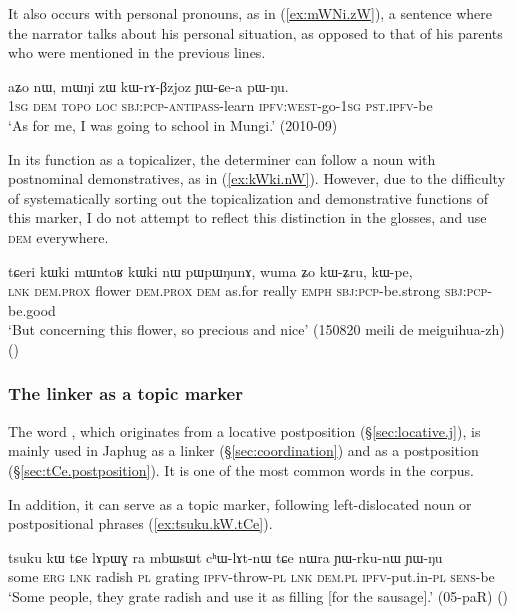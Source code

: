 It also occurs with personal pronouns, as in (\ref{ex:mWNi.zW}), a sentence where the narrator talks about his personal situation, as opposed to that of his parents who were mentioned in the previous lines.

\begin{exe}
\ex \label{ex:mWNi.zW}
\gll aʑo nɯ, mɯŋi zɯ kɯ-rɤ-βzjoz ɲɯ-ɕe-a pɯ-ŋu. \\
\textsc{1sg} \textsc{dem}  \textsc{topo} \textsc{loc} \textsc{sbj}:\textsc{pcp}-\textsc{antipass}-learn \textsc{ipfv}:\textsc{west}-go-\textsc{1sg} \textsc{pst}.\textsc{ipfv}-be \\
\glt `As for me, I was going to school in Mungi.' (2010-09)
\end{exe}

In its function as a topicalizer, the determiner  can follow a noun with postnominal demonstratives, as in (\ref{ex:kWki.nW}). However, due to the difficulty of systematically sorting out the topicalization and demonstrative functions of this marker, I do not attempt to reflect this distinction in the glosses, and use  \textsc{dem} everywhere.

\begin{exe}
\ex \label{ex:kWki.nW}
\gll tɕeri kɯki mɯntoʁ kɯki nɯ pɯpɯŋunɤ, wuma ʑo kɯ-ʑru, kɯ-pe, \\
\textsc{lnk} \textsc{dem}.\textsc{prox} flower \textsc{dem}.\textsc{prox} \textsc{dem} as.for really \textsc{emph} \textsc{sbj}:\textsc{pcp}-be.strong \textsc{sbj}:\textsc{pcp}-be.good \\ 
\glt `But concerning this flower, so precious and nice' (150820 meili de meiguihua-zh) ()
\end{exe}

\subsubsection{The linker  as a topic marker} \label{sec:tCe.topic}
The word , which originates from a locative postposition (§\ref{sec:locative.j}), is mainly used in Japhug as a linker (§\ref{sec:coordination}) and as a postposition (§\ref{sec:tCe.postposition}). It is one of the most common words in the corpus.

In addition, it can serve as a topic marker, following left-dislocated noun or postpositional phrases (\ref{ex:tsuku.kW.tCe}).

\begin{exe}
\ex \label{ex:tsuku.kW.tCe}
\gll tsuku kɯ tɕe lɤpɯɣ ra mbɯsɯt cʰɯ-lɤt-nɯ tɕe nɯra ɲɯ-rku-nɯ ɲɯ-ŋu \\
some \textsc{erg} \textsc{lnk} radish \textsc{pl} grating \textsc{ipfv}-throw-\textsc{pl} \textsc{lnk} \textsc{dem}.\textsc{pl} \textsc{ipfv}-put.in-\textsc{pl} \textsc{sens}-be \\
\glt `Some people, they grate radish and use it as filling [for the sausage].' (05-paR) ()
\end{exe}

